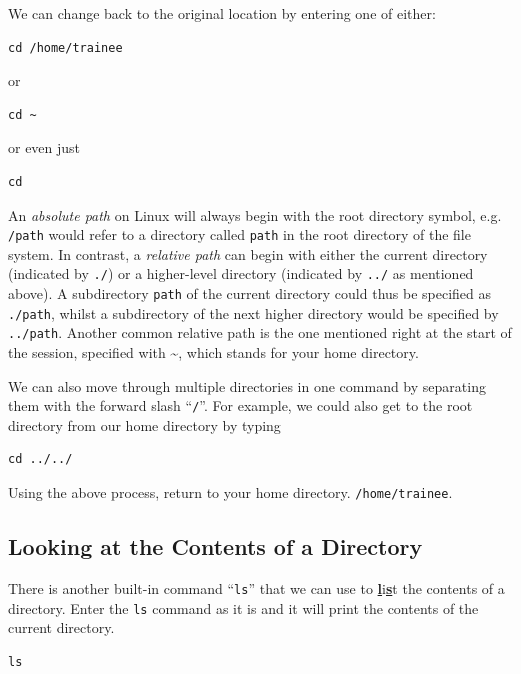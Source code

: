 \documentclass[a4paper,12pt,twoside]{memoir}
\begin{document}
We can change back to the original location by entering one of either:
\begin{steps}
\begin{lstlisting}
cd /home/trainee
\end{lstlisting}
or \\
\begin{lstlisting}
cd ~ 
\end{lstlisting}
or even just \\
\begin{lstlisting}
cd
\end{lstlisting}
\end{steps}

\begin{information}
An \textit{absolute path} on Linux will always begin with the root directory symbol, e.g. \texttt{/path} would refer to a directory called \texttt{path} in the root directory of the file system.
In contrast, a \textit{relative path} can begin with either the current directory (indicated by \texttt{./}) or a higher-level directory (indicated by \texttt{../} as mentioned above).
A subdirectory \texttt{path} of the current directory could thus be specified as \texttt{./path}, whilst a subdirectory of the next higher directory would be specified by \texttt{../path}. 
Another common relative path is the one mentioned right at the start of the session, specified with \~{}, which stands for your home directory.\\
\end{information}

We can also move through multiple directories in one command by separating them with the forward slash ``\texttt{/}''.
For example, we could also get to the root directory from our home directory by typing \\
\begin{lstlisting}
cd ../../ 
\end{lstlisting}

\begin{steps}
Using the above process, return to your home directory.
\texttt{/home/trainee}. \\
\end{steps}

\subsection{Looking at the Contents of a Directory}
\begin{steps}
There is another built-in command ``\texttt{ls}'' that we can use to \textbf{\underline{l}}i\textbf{\underline{s}}t the contents of a directory.
Enter the \texttt{ls} command as it is and it will print the contents of the current directory. \\
\begin{lstlisting}
ls 
\end{lstlisting}
\end{steps}
\end{document}
